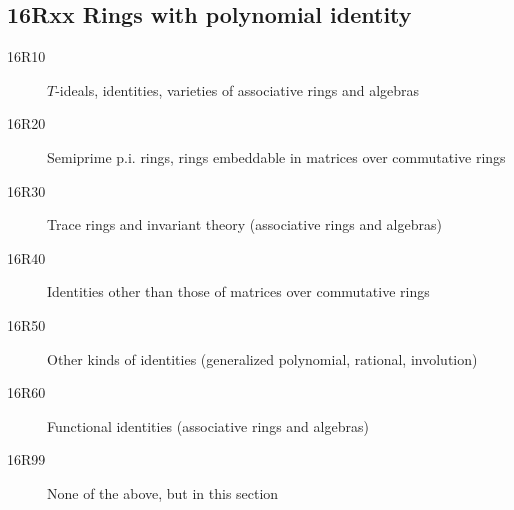 \documentclass[letterpaper]{article}
\begin{document}
\subsection*{16Rxx  Rings with polynomial identity}\label{16Rxx}
\begin{description}  
\item [16R10]\label{16R10} $T$-ideals, identities, varieties of associative rings and algebras
\item [16R20]\label{16R20} Semiprime p.i. rings, rings embeddable in matrices over commutative rings
\item [16R30]\label{16R30} Trace rings and invariant theory (associative rings and algebras)
\item [16R40]\label{16R40} Identities other than those of matrices over commutative rings
\item [16R50]\label{16R50} Other kinds of identities (generalized polynomial, rational, involution)
\item [16R60]\label{16R60} Functional identities (associative rings and algebras)
\item [16R99]\label{16R99} None of the above, but in this section
\end{description}
\end{document}
